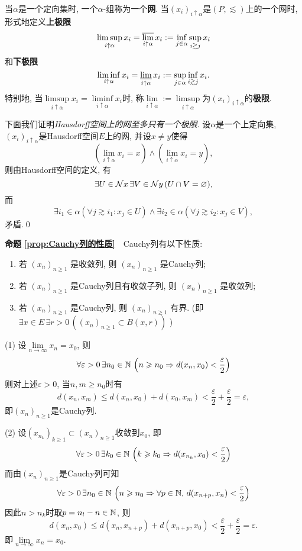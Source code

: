 \begin{appendix}
\begin{Definition}
		当$ \alpha $是一个定向集时, 一个$ \alpha $-组称为一个\textbf{网}. 当$ (x_i)_{i\uparrow\alpha} $是$ (P,\lesssim) $上的一个网时, 形式地定义\textbf{上极限}
		\[
		\limsup_{i\uparrow\alpha}x_i=\varlimsup_{i\uparrow\alpha}x_i:=\inf_{j\in\alpha}\sup_{i\gtrsim j}x_i
		\]
		和\textbf{下极限}
		\[
		\liminf_{i\uparrow\alpha}x_i=\varliminf_{i\uparrow\alpha}x_i:=\sup_{j\in\alpha}\inf_{i\gtrsim j}x_i.
		\]
		特别地, 当$ \limsup\limits_{i\uparrow\alpha}x_i=\liminf\limits_{i\uparrow\alpha}x_i $时, 称$ \lim\limits_{i\uparrow\alpha}:=\limsup\limits_{i\uparrow\alpha} $为$ (x_i)_{i\uparrow\alpha} $的\textbf{极限}.
	\end{Definition}
	\begin{Proof}
	下面我们证明\textsl{Hausdorff空间上的网至多只有一个极限}. 设$ \alpha $是一个上定向集, $ (x_i)_{i\uparrow\alpha} $是Hausdorff空间$ E $上的网, 并设$ x\ne y $使得
	\[
	\left(\lim_{i\uparrow\alpha}x_i=x\right)\land\left(\lim_{i\uparrow\alpha}x_i=y\right),
	\]
	则由Hausdorff空间的定义, 有
	\[
	\exists U\in\mathcal{N}{x}\,\exists V\in\mathcal{N}{y}\,(U\cap V=\varnothing),
	\]
	而
	\[
	\exists i_1\in\alpha( \forall j\gtrsim i_1 : x_j\in U )\land\exists i_2\in\alpha( \forall j\gtrsim i_2 : x_j\in V ),
	\]
	矛盾.\qed
	\end{Proof}
	
	\textbf{命题\,\,\ref{prop:Cauchy列的性质}}\ \ Cauchy列有以下性质:
		\begin{enumerate}[(1)]
	    	\item 若 $ (x_{n})_{n\geqslant1} $ 是收敛列, 则 $ (x_{n})_{n\geqslant1} $ 是Cauchy列;
	        \item 若 $ (x_{n})_{n\geqslant1} $ 是Cauchy列且有收敛子列, 则 $ (x_{n})_{n\geqslant1} $ 是收敛列;
	        \item 若 $ (x_{n})_{n\geqslant1} $ 是Cauchy列, 则 $ (x_{n})_{n\geqslant1} $ 有界. (即 $ \exists x\in E\,\exists r>0\,((x_{n})_{n\geqslant1} \subset B(x, r)) $ )
	   \end{enumerate}
	\begin{Proof}
	(1) 设$ \lim\limits_{n\to\infty}x_n=x_0 $, 则
	\[
	\forall\varepsilon>0\,\exists n_0\in\mathbb{N}\,\left(n\geqslant n_0\Rightarrow d(x_n,x_0)<\frac{\varepsilon}{2}\right)
	\]
	则对上述$ \varepsilon>0 $, 当$ n,m\geqslant n_0 $时有
	\[
	d(x_n,x_m)\leqslant d(x_n,x_0)+d(x_0,x_m)<\frac{\varepsilon}{2}+\frac{\varepsilon}{2}=\varepsilon,
	\]
	即$ (x_n)_{n\geqslant 1} $是Cauchy列.
	
	(2) 设$ (x_{n_k})_{k\geqslant 1}\subset(x_n)_{n\geqslant 1} $收敛到$ x_0 $, 即
	\[
	\forall\varepsilon>0\,\exists k_0\in\mathbb{N}\,\left(k\geqslant k_0\Rightarrow d(x_{n_k},x_0)<\frac{\varepsilon}{2}\right)
	\]
	而由$ (x_n)_{n\geqslant 1} $是Cauchy列可知
	\[
	\forall\varepsilon>0\,\exists n_0\in\mathbb{N}\,\left( n\geqslant n_0\Rightarrow\forall p\in\mathbb{N},\,d(x_{n+p},x_n)<\frac{\varepsilon}{2} \right)
	\]
	因此$ n>n_k $时取$ p=n_l-n\in\mathbb{N} $, 则
	\[
	d(x_n,x_0)\leqslant d(x_n,x_{n+p})+d(x_{n+p},x_0)<\frac{\varepsilon}{2}+\frac{\varepsilon}{2}=\varepsilon.
	\]
	即$ \lim\limits_{n\to\infty}x_n=x_0 $.
	

\end{Proof}
\end{appendix}
